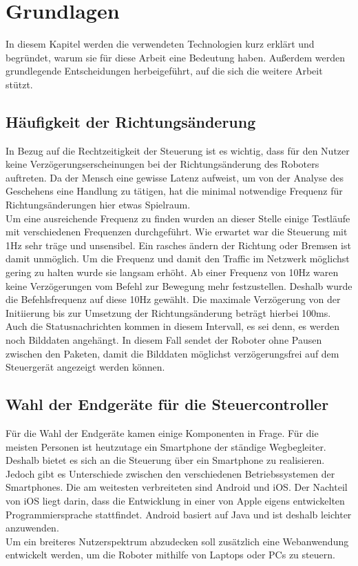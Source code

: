 \chapter{Grundlagen}
\label{ch:Grundlagen}

In diesem Kapitel werden die verwendeten Technologien kurz erklärt und begründet, warum sie für diese Arbeit eine Bedeutung haben. Außerdem werden grundlegende Entscheidungen herbeigeführt, auf die sich die weitere Arbeit stützt.

\section{Häufigkeit der Richtungsänderung}
In Bezug auf die Rechtzeitigkeit der Steuerung ist es wichtig, dass für den Nutzer keine Verzögerungserscheinungen bei der Richtungsänderung des Roboters auftreten. Da der Mensch eine gewisse Latenz aufweist, um von der Analyse des Geschehens eine Handlung zu tätigen, hat die minimal notwendige Frequenz für Richtungsänderungen hier etwas Spielraum. \\
Um eine ausreichende Frequenz zu finden wurden an dieser Stelle einige Testläufe mit verschiedenen Frequenzen durchgeführt. Wie erwartet war die Steuerung mit 1Hz sehr träge und unsensibel. Ein rasches ändern der Richtung oder Bremsen ist damit unmöglich. Um die Frequenz und damit den Traffic im Netzwerk möglichst gering zu halten wurde sie langsam erhöht. Ab einer Frequenz von 10Hz waren keine Verzögerungen vom Befehl zur Bewegung mehr festzustellen. Deshalb wurde die Befehlsfrequenz auf diese 10Hz gewählt. Die maximale Verzögerung von der Initiierung bis zur Umsetzung der Richtungsänderung beträgt hierbei 100ms. Auch die Statusnachrichten kommen in diesem Intervall, es sei denn, es werden noch Bilddaten angehängt. In diesem Fall sendet der Roboter ohne Pausen zwischen den Paketen, damit die Bilddaten möglichst verzögerungsfrei auf dem Steuergerät angezeigt werden können. 


\section{Wahl der Endgeräte für die Steuercontroller}
\label{sec:wahl_endgeraete}
Für die Wahl der Endgeräte kamen einige Komponenten in Frage. Für die meisten Personen ist heutzutage ein Smartphone der ständige Wegbegleiter. Deshalb bietet es sich an die Steuerung über ein Smartphone zu realisieren. Jedoch gibt es Unterschiede zwischen den verschiedenen Betriebssystemen der Smartphones. Die am weitesten verbreiteten sind Android und iOS. Der Nachteil von iOS liegt darin, dass die Entwicklung in einer von Apple eigens entwickelten Programmiersprache stattfindet. Android basiert auf Java und ist deshalb leichter anzuwenden. \\
Um ein breiteres Nutzerspektrum abzudecken soll zusätzlich eine Webanwendung entwickelt werden, um die Roboter mithilfe von Laptops oder PCs zu steuern. 



